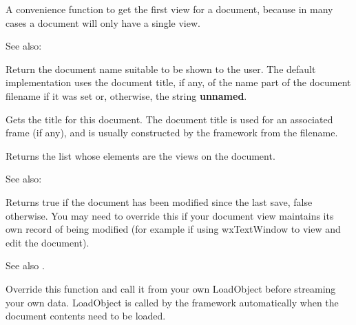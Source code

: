 
A convenience function to get the first view for a document, because
in many cases a document will only have a single view.

See also: 

\label{wxdocumentgetuserreadablentablename}


Return the document name suitable to be shown to the user. The default
implementation uses the document title, if any, of the name part of the
document filename if it was set or, otherwise, the string {\bf unnamed}.

\label{wxdocumentgettitle}


Gets the title for this document. The document title is used for an associated
frame (if any), and is usually constructed by the framework from
the filename.

\label{wxdocumentgetviews}


Returns the list whose elements are the views on the document.

See also: 

\label{wxdocumentismodified}


Returns true if the document has been modified since the last save, false otherwise.
You may need to override this if your document view maintains its own
record of being modified (for example if using wxTextWindow to view and edit the document).

See also .

\label{wxdocumentloadobject}



Override this function and call it from your own LoadObject before
streaming your own data. LoadObject is called by the framework
automatically when the document contents need to be loaded.


